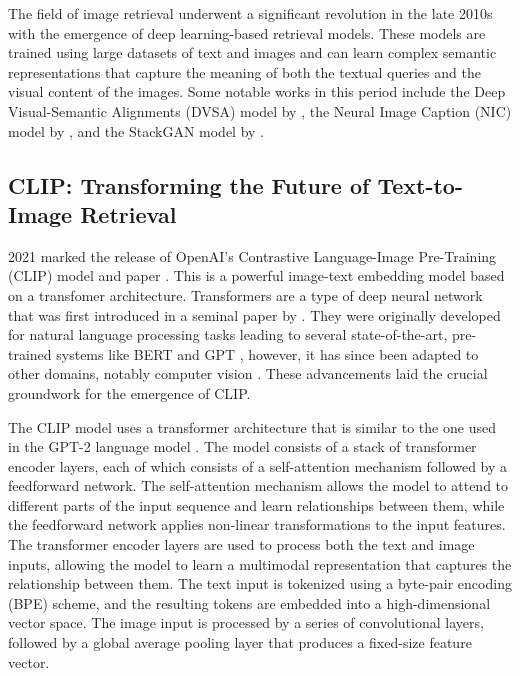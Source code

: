 \documentclass{l4proj}
\begin{document}
The field of image retrieval underwent a significant revolution in the late 2010s with the emergence of deep learning-based retrieval models. These models are trained using large datasets of text and images and can learn complex semantic representations that capture the meaning of both the textual queries and the visual content of the images. Some notable works in this period include the Deep Visual-Semantic Alignments (DVSA) model by \cite{karpathy2015dvsa}, the Neural Image Caption (NIC) model by \cite{vinyals2015nic}, and the StackGAN model by \cite{zhang2017stackgan}.


\subsection{CLIP: Transforming the Future of Text-to-Image Retrieval}
2021 marked the release of OpenAI's Contrastive Language-Image Pre-Training (CLIP) model and paper \citep{radford2021clip}. This is a powerful image-text embedding model based on a transfomer architecture. Transformers are a type of deep neural network that was first introduced in a seminal paper by \cite{vaswani2017attention}. They were originally developed for natural language processing tasks leading to several state-of-the-art, pre-trained systems like BERT \citep{devlin2018bert} and GPT \citep{radford2018gpt}, however, it has since been adapted to other domains, notably computer vision \citep{dosovitskiy2020vit}. These advancements laid the crucial groundwork for the emergence of CLIP.

The CLIP model uses a transformer architecture that is similar to the one used in the GPT-2 language model \citep{radford2019gpt2}. The model consists of a stack of transformer encoder layers, each of which consists of a self-attention mechanism followed by a feedforward network. The self-attention mechanism allows the model to attend to different parts of the input sequence and learn relationships between them, while the feedforward network applies non-linear transformations to the input features. The transformer encoder layers are used to process both the text and image inputs, allowing the model to learn a multimodal representation that captures the relationship between them. The text input is tokenized using a byte-pair encoding (BPE) scheme, and the resulting tokens are embedded into a high-dimensional vector space. The image input is processed by a series of convolutional layers, followed by a global average pooling layer that produces a fixed-size feature vector.
\end{document}
